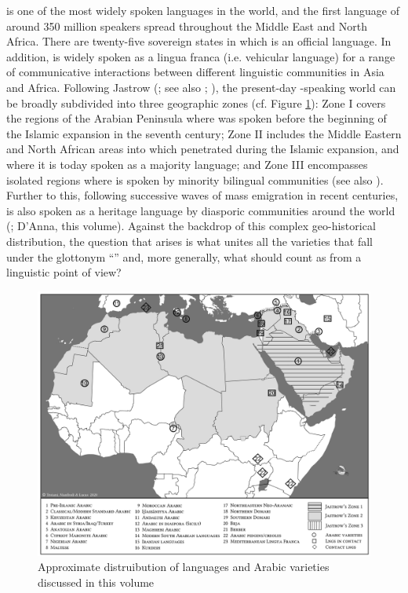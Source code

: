 \documentclass[output=paper]{langsci/langscibook}
\begin{document}
 is one of the most widely spoken languages in the world, and the first language of around 350 million speakers spread throughout the Middle East and North Africa. There are twenty-five sovereign states in which  is an official language. In addition,  is widely spoken as a lingua franca (i.e. vehicular language) for a range of communicative interactions between different linguistic communities in Asia and Africa. Following Jastrow (\citeyear{Jastrow2002}; see also \citealt{Watson2011dialectsoverview}; \citealt{Manfrediforthcoming}), the present-day -speaking world can be broadly subdivided into three geographic zones (cf. Figure \ref{intromap}): Zone I covers the regions of the Arabian Peninsula where  was spoken before the beginning of the Islamic expansion in the seventh century; Zone II includes the Middle Eastern and North African areas into which  penetrated during the Islamic expansion, and where it is today spoken as a majority language; and Zone III encompasses isolated regions where  is spoken by minority bilingual communities (see also \citealt{Owens2000editor}). Further to this, following successive waves of mass emigration in recent centuries,  is also spoken as a heritage language by diasporic communities around the world (\citealt{Rouchdy_arabic_1992,BoumansdeRuiter2002}; D’Anna, this volume). Against the backdrop of this complex geo-historical distribution, the question that arises is what unites all the varieties that fall under the glottonym ``'' and, more generally, what should count as  from a linguistic point of view?

\begin{figure}
\includegraphics[width=\textwidth]{figures/intromap.jpg}
\caption{Approximate distruibution of languages and Arabic varieties discussed in this volume}
\label{intromap}
\end{figure}
\end{document}
